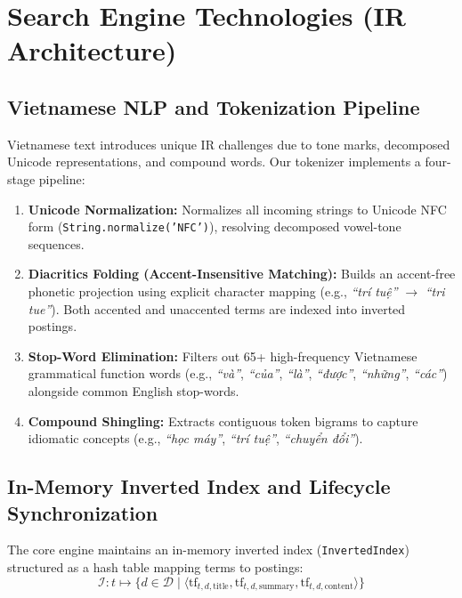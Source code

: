 \documentclass[conference]{IEEEtran}
\begin{document}
\section{Search Engine Technologies (IR Architecture)}
\subsection{Vietnamese NLP and Tokenization Pipeline}
Vietnamese text introduces unique IR challenges due to tone marks, decomposed Unicode representations, and compound words. Our tokenizer implements a four-stage pipeline:
\begin{enumerate}
    \item \textbf{Unicode Normalization:} Normalizes all incoming strings to Unicode NFC form (\texttt{String.normalize('NFC')}), resolving decomposed vowel-tone sequences.
    \item \textbf{Diacritics Folding (Accent-Insensitive Matching):} Builds an accent-free phonetic projection using explicit character mapping (e.g., \textit{``trí tuệ''} $\rightarrow$ \textit{``tri tue''}). Both accented and unaccented terms are indexed into inverted postings.
    \item \textbf{Stop-Word Elimination:} Filters out 65+ high-frequency Vietnamese grammatical function words (e.g., \textit{``và''}, \textit{``của''}, \textit{``là''}, \textit{``được''}, \textit{``những''}, \textit{``các''}) alongside common English stop-words.
    \item \textbf{Compound Shingling:} Extracts contiguous token bigrams to capture idiomatic concepts (e.g., \textit{``học máy''}, \textit{``trí tuệ''}, \textit{``chuyển đổi''}).
\end{enumerate}

\subsection{In-Memory Inverted Index and Lifecycle Synchronization}
The core engine maintains an in-memory inverted index (\texttt{InvertedIndex}) structured as a hash table mapping terms to postings:
\begin{equation}
\mathcal{I}: t \mapsto \{ d \in \mathcal{D} \mid \langle \text{tf}_{t,d,\text{title}}, \text{tf}_{t,d,\text{summary}}, \text{tf}_{t,d,\text{content}} \rangle \}
\end{equation}
\end{document}
